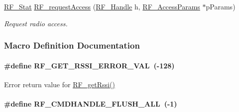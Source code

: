 \begin{DoxyCompactItemize}
\hyperlink{_r_f_8h_afdc219ddabc8427ecd552a6c78d9988f}{R\+F\+\_\+\+Stat} \hyperlink{_r_f_8h_a40a5506c05a11a3cd9d379cedad5b5d0}{R\+F\+\_\+request\+Access} (\hyperlink{_r_f_8h_a5e8ab7fc87fb818f435d9b6226ee573f}{R\+F\+\_\+\+Handle} h, \hyperlink{struct_r_f___access_params}{R\+F\+\_\+\+Access\+Params} $\ast$p\+Params)
\begin{DoxyCompactList}\small\item\em Request radio access. \end{DoxyCompactList}\end{DoxyCompactItemize}


\subsubsection{Macro Definition Documentation}
\paragraph[{R\+F\+\_\+\+G\+E\+T\+\_\+\+R\+S\+S\+I\+\_\+\+E\+R\+R\+O\+R\+\_\+\+V\+A\+L}]{\setlength{\rightskip}{0pt plus 5cm}\#define R\+F\+\_\+\+G\+E\+T\+\_\+\+R\+S\+S\+I\+\_\+\+E\+R\+R\+O\+R\+\_\+\+V\+A\+L~(-\/128)}\label{_r_f_8h_a40e933adc8b5b1c03133451361c5505b}


Error return value for \hyperlink{_r_f_8h_ac3fe0d39243fb6bbefe0216d958a6779}{R\+F\+\_\+get\+Rssi()} 

\paragraph[{R\+F\+\_\+\+C\+M\+D\+H\+A\+N\+D\+L\+E\+\_\+\+F\+L\+U\+S\+H\+\_\+\+A\+L\+L}]{\setlength{\rightskip}{0pt plus 5cm}\#define R\+F\+\_\+\+C\+M\+D\+H\+A\+N\+D\+L\+E\+\_\+\+F\+L\+U\+S\+H\+\_\+\+A\+L\+L~(-\/1)}\label{_r_f_8h_aacfd2e3e3a2596605cc8b182df438b2f}


